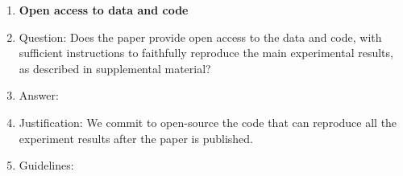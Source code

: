 \begin{enumerate}
\item {\bf Open access to data and code}
    \item[] Question: Does the paper provide open access to the data and code, with sufficient instructions to faithfully reproduce the main experimental results, as described in supplemental material?
    \item[] Answer: \answerYes{} %
    \item[] Justification: We commit to open-source the code that can reproduce all the experiment results after the paper is published.
    \item[] Guidelines:



\end{enumerate}
